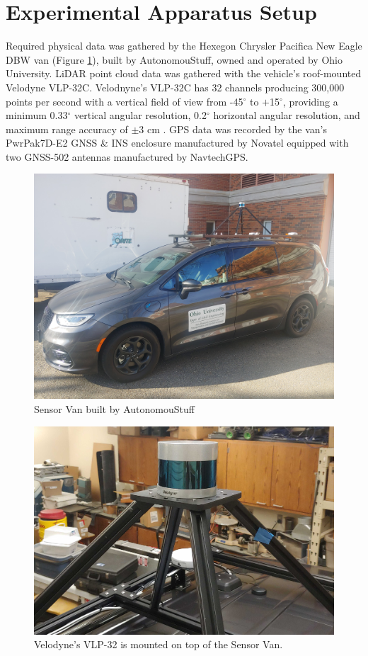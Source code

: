 \documentclass[numbered,pdftex]{ohio-etd}
\begin{document}
{	\section{Experimental Apparatus Setup}\label{sec:experimental-apparatus-setup}{
		
		{Required physical data was gathered by the Hexegon Chrysler Pacifica New Eagle DBW van (Figure \ref{fig:Experimental_Apperatus}), built by AutonomouStuff, owned and operated by Ohio University. LiDAR point cloud data was gathered with the vehicle's roof-mounted Velodyne VLP-32C. Velodnyne's VLP-32C has 32 channels producing 300,000 points per second with a vertical field of view from -45$^{\circ}$ to $+$15$^{\circ}$, providing a minimum 0.33$^{\circ}$ vertical angular resolution, 0.2$^{\circ}$ horizontal angular resolution, and maximum range accuracy of $\pm 3$ cm \cite{vlp_32c}. GPS data was recorded by the van's PwrPak7D-E2 GNSS \& INS enclosure manufactured by Novatel equipped with two GNSS-502 antennas manufactured by NavtechGPS.}
		
		\begin{figure}[H]
			\centering
			\includegraphics[width=0.7\linewidth]{Defense_Images/van_on_van}
			\caption[Sensor Van]{Sensor Van built by AutonomouStuff}
			\label{fig:Experimental_Apperatus}
		\end{figure}
	
		\begin{figure}[H]
			\centering
			\includegraphics[width=0.7\linewidth]{Defense_Images/vlp_32_mount_2}
			\caption[VLP 32 on Van]{Velodyne's VLP-32 is mounted on top of the Sensor Van.}
			\label{fig:vlp32mount}
		\end{figure}
	
}}
\end{document}
